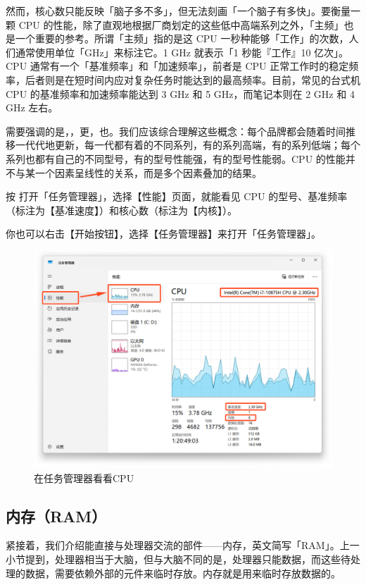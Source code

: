 然而，核心数只能反映「脑子多不多」，但无法刻画「一个脑子有多快」。要衡量一颗 CPU 的性能，除了直观地根据厂商划定的这些低中高端系列之外，「主频」也是一个重要的参考。所谓「主频」指的是这 CPU 一秒种能够「工作」的次数，人们通常使用单位「GHz」来标注它。1 GHz 就表示「1 秒能『工作』10 亿次」。CPU 通常有一个「基准频率」和「加速频率」，前者是 CPU 正常工作时的稳定频率，后者则是在短时间内应对复杂任务时能达到的最高频率。目前，常见的台式机 CPU 的基准频率和加速频率能达到 3 GHz 和 5 GHz，而笔记本则在 2 GHz 和 4 GHz 左右。

需要强调的是，，更，也。我们应该综合理解这些概念：每个品牌都会随着时间推移一代代地更新，每一代都有着的不同系列，有的系列高端，有的系列低端；每个系列也都有自己的不同型号，有的型号性能强，有的型号性能弱。CPU 的性能并不与某一个因素呈线性的关系，而是多个因素叠加的结果。

按  打开「任务管理器」，选择【性能】页面，就能看见 CPU 的型号、基准频率（标注为【基准速度】）和核心数（标注为【内核】）。

\begin{note}
  你也可以右击【开始按钮】，选择【任务管理器】来打开「任务管理器」。
\end{note}

\begin{figure}[htb!]
  \centering
  \includegraphics[width=.7\textwidth]{assets/basic/Check_CPU.png}
  \caption{在任务管理器看看CPU}
  \label{fig:Check_CPU}
\end{figure}

\subsection{内存（RAM）}

紧接着，我们介绍能直接与处理器交流的部件——内存，英文简写「RAM」。上一小节提到，处理器相当于大脑，但与大脑不同的是，处理器只能数据，而这些待处理的数据，需要依赖外部的元件来临时存放。内存就是用来临时存放数据的。


